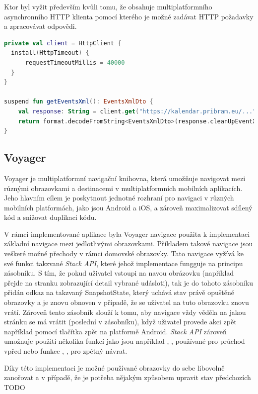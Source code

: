Ktor byl vyžit především kvůli tomu, že obsahuje multiplatformního asynchronního HTTP klienta pomocí kterého je možné zadávat HTTP požadavky a 
zpracovávat odpovědi. 

\begin{lstlisting}[caption={Definice barevných motivů}, label={lst:colorsDef}, language=Kotlin]
private val client = HttpClient {
  install(HttpTimeout) {
      requestTimeoutMillis = 40000
  }
}

suspend fun getEventsXml(): EventsXmlDto {
    val response: String = client.get("https://kalendar.pribram.eu/...").body()
    return format.decodeFromString<EventsXmlDto>(response.cleanUpEventXml())
}
\end{lstlisting}

\subsection{Voyager}
Voyager je multiplatformní navigační knihovna, která umožňuje navigovat mezi různými obrazovkami a destinacemi v multiplatformních mobilních
 aplikacích. \cite{voyager} Jeho hlavním cílem je poskytnout jednotné rozhraní pro navigaci v různých mobilních platformách, jako jsou Android a iOS, a 
 zároveň maximalizovat sdílený kód a snižovat duplikaci kódu.

 V rámci implementované aplikace byla Voyager navigace použita k implementaci základní navigace mezi jedlotlivými obrazovkami.
 Příkladem takové navigace jsou veškeré možné přechody v rámci domovské obrazovky. Tato navigace vyžívá ke své funkci takzvané 
 \textit{Stack API}, které jehož implementace fungguje na principu zásobníku. S tím, že pokud uživatel vstoupi na navou obrázovku 
 (například přejde na stranku zobrazující detail vybrané udásloti), tak je do tohoto zásobníku přidán odkaz na takzvaný SnapshotState,
 který uchává stav právě opuštěné obrazovky a je znovu obnoven v případě, že se uživatel na tuto obrazovku znovu vrátí. Zároveň tento
 zásobník slouží k tomu, aby navigace vždy věděla na jakou stránku se má vrátit (poslední v zásobníku), když uživatel provede akci zpět
 například pomocí tlačítka zpět na platformě Android. \textit{Stack API} zároveň umožnuje použití několika funkcí jako jsou například 
 , ,  používané pro průchod vpřed nebo funkce , , 
  pro zpětný návrat. 

 Díky této implementaci je možné používané obrazovky do sebe libovolně zanořovat a v případě, že je potřeba nějakým způsobem upravit
 stav předchozích TODO

